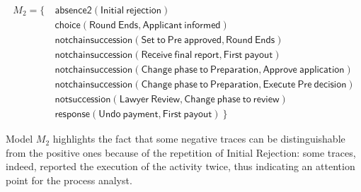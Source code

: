 \begin{align*}
M_2 = \{ \ &  \mathsf{ absence2(Initial\ rejection)} \\
& \mathsf{ choice(Round\ Ends, Applicant\ informed)} \\
& \mathsf{ notchainsuccession(Set\ to\ Pre\ approved, Round\ Ends)} \\
& \mathsf{ notchainsuccession(Receive\ final\ report, First\ payout)} \\
& \mathsf{ notchainsuccession(Change\ phase\ to\ Preparation, Approve\ application)} \\
& \mathsf{ notchainsuccession(Change\ phase\ to\ Preparation, Execute\ Pre\ decision)} \\
& \mathsf{ notsuccession(Lawyer\ Review, Change\ phase\ to\ review)} \\
& \mathsf{ response(Undo\ payment, First\ payout) } \ \} 
\end{align*}

Model $M_2$ %
highlights the fact that some negative traces can be distinguishable from the positive ones because of the repetition of \textsf{Initial Rejection}: some traces, indeed, reported the execution of the activity twice, thus indicating an attention point for the process analyst.


